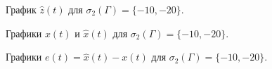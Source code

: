 \begin{figure}[!h]
\caption{График $\hat{z}(t)$ для $ \sigma_2 (\Gamma) = \{ -10, -20 \}$.}
\label{3_z_nlin_02_LW3}
\end{figure}

\begin{figure}[!h]
\caption{Графики $x(t)$ и $\hat{x}(t)$ для $ \sigma_2 (\Gamma) = \{ -10, -20 \}$.}
\label{3_xx_nlin_02_LW3}
\end{figure}

\begin{figure}[!h]
\caption{Графики $e (t) =\hat{x}(t) - x(t)$ для $ \sigma_2 (\Gamma) = \{ -10, -20 \}$.}
\label{3_e_nlin_02_LW3}
\end{figure}


